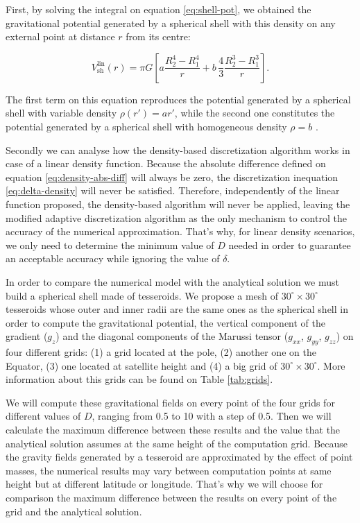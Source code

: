 \documentclass[extra]{gji}
\begin{document}
First, by solving the integral on equation \ref{eq:shell-pot}, we obtained the 
gravitational potential generated by a spherical shell with this density on 
any external point at distance $r$ from its centre:

\begin{equation}
    V_\text{sh}^\text{lin}(r) = \pi G \left[ 
    a \frac{R_2^4 - R_1^4}{r} +
    b \,\frac{4}{3} \frac{R_2^3 - R_1^3}{r} \right].
    \label{eq:shell-pot-linear}
\end{equation}

\noindent The first term on this equation reproduces the potential generated 
by a spherical shell with variable density $\rho(r') = ar'$, while the second 
one constitutes the potential generated by a spherical shell with homogeneous 
density $\rho = b$ \citep{Mikuska2006,Grombein2013}.

Secondly we can analyse how the density-based discretization algorithm 
works in case of a linear density function.
Because the absolute difference defined on equation 
\ref{eq:density-abs-diff} will always be zero, the discretization 
inequation \ref{eq:delta-density} will never be satisfied.
Therefore, independently of the linear function proposed, the 
density-based algorithm will never be applied, leaving the modified 
adaptive discretization algorithm as the only mechanism to control the 
accuracy of the numerical approximation.
That's why, for linear density scenarios, we only need to determine 
the minimum value of $D$ needed in order to guarantee an acceptable 
accuracy while ignoring the value of $\delta$.

In order to compare the numerical model with the analytical solution we 
must build a spherical shell made of tesseroids.
We propose a mesh of $30^\circ \times 30^\circ$ tesseroids whose outer and 
inner radii are the same ones as the spherical shell in order to compute 
the gravitational potential, the vertical component of the gradient 
($g_z$) and the diagonal components of the Marussi tensor ($g_{xx}$, 
$g_{yy}$, $g_{zz}$) on four different grids: (1) a grid located at the 
pole, (2) another one on the Equator, (3) one located at satellite 
height and (4) a big grid of $30^\circ \times 30^\circ$.
More information about this grids can be found on Table 
\ref{tab:grids}.

We will compute these gravitational fields on every point of the four 
grids for different values of $D$, ranging from 0.5 to 10 with a step 
of 0.5.
Then we will calculate the maximum difference between these results and the 
value that the analytical solution assumes at the same height of the 
computation grid.
Because the gravity fields generated by a tesseroid are approximated by 
the effect of point masses, the numerical results may vary between 
computation points at same height but at different latitude or 
longitude.
That's why we will choose for comparison the maximum difference between the 
results on every point of the grid and the analytical solution.
\end{document}
